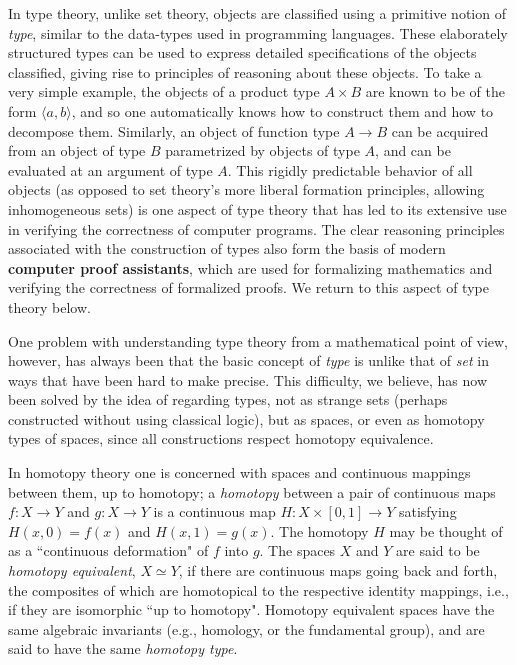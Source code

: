{%

In type theory, unlike set theory, objects are classified using a primitive notion of \emph{type}, similar to the data-types used in programming languages.  These elaborately structured types can be used to express detailed specifications of the objects classified, giving rise to principles of reasoning about these objects.  To take a very simple example, the objects of a product type $A\times B$ are known to be of the form $\langle a, b\rangle$, and so one automatically knows how to construct them and how to decompose them. Similarly, an object of function type $A\to B$ can be acquired from an object of type $B$ parametrized by objects of type $A$, and can be evaluated at an argument of type $A$.  This rigidly predictable behavior of all objects (as opposed to set theory's more liberal formation principles, allowing inhomogeneous sets) is one aspect of type theory that has led to its extensive use in verifying the correctness of computer programs.  The clear reasoning principles associated with the construction of types also form the basis of modern {\bf computer proof assistants}, which are used for formalizing mathematics and verifying the correctness of formalized proofs.  We return to this aspect of type theory below.  



One problem with understanding type theory from a mathematical point of view, however, has always been that the basic concept of \emph{type} is unlike that of \emph{set} in ways that have been hard to make precise. This difficulty, we believe, has now been solved by the idea of regarding types, not as strange sets (perhaps constructed without using classical logic), but as spaces, or even as homotopy types of spaces, since all constructions respect homotopy equivalence.

In homotopy theory one is concerned with spaces and continuous mappings between them, 
up to homotopy; a \emph{homotopy} between a pair of continuous maps $f \colon X	\to Y$
and  $g \colon X	\to Y$ is 
a continuous map $H \colon X \times [0, 1]	\to Y$ satisfying
$H(x, 0) = f (x)$  and $H(x, 1) = g(x)$. The homotopy $H$ may be thought of as a ``continuous deformation" of $f$ into $g$. The spaces $X$ and $Y$ are said to be \emph{homotopy equivalent}, $X\simeq Y$, if there are continuous maps going back and forth, the composites of which are homotopical to the respective identity mappings, i.e., if they are isomorphic ``up to homotopy".  Homotopy equivalent spaces have the same algebraic invariants (e.g., homology, or the fundamental group), and are said to have the same \emph{homotopy type}.

}
